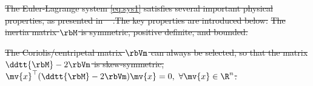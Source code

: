 \documentclass[letterpaper, journal]{IEEEtran}
\providecommand{\DIFdel}[1]{{\protect\color{red}\sout{#1}}} %
\providecommand{\DIFdelbegin}{} %
\providecommand{\DIFdelend}{} %
\begin{document}
\DIFdelbegin \DIFdel{The Euler-Lagrange system \eqref{eq:sys1} satisfies several important physical properties, as presented in \mbox{%
\cite[Chap. 3, Tab. 3.2.1]{Lewis:1998aa}}\hskip0pt%
.The key properties are introduced below:
}%
\DIFdel{The inertia matrix $\rbM$ is symmetric, positive definite, and bounded.
}%
\DIFdelend %

\DIFdelbegin %
\DIFdel{The Coriolis/centripetal matrix $\rbVm$ can always be selected, so that the matrix $\ddtt{\rbM}-2\rbVm$ is skew-symmetric, }%
\DIFdel{$\mv{x}^\top(\ddtt{\rbM}-2\rbVm)\mv{x}=0,\ \forall \mv{x}\in\R^n$.
}%
\DIFdelend %
\end{document}
